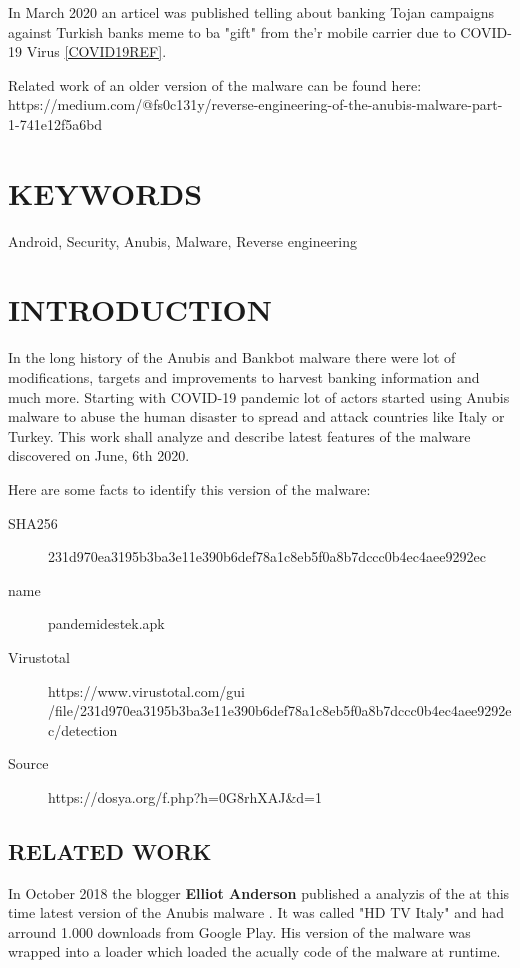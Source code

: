 \documentclass[10pt,titlepage]{article}
\begin{document}
In March 2020 an articel was published telling about banking Tojan campaigns against Turkish banks meme to ba "gift" from the'r mobile carrier due to COVID-19 Virus \ref{COVID19REF}. \cite{ANUBISTURKEY2020} 


Related work of an older version of the malware can be found here: https://medium.com/@fs0c131y/reverse-engineering-of-the-anubis-malware-part-1-741e12f5a6bd

\section{KEYWORDS}
	Android,
    Security,
    Anubis,
    Malware,
    Reverse engineering

\section{INTRODUCTION}
In the long history of the Anubis and Bankbot malware there were lot of modifications, targets and improvements to harvest banking information and much more. Starting with COVID-19 pandemic lot of actors started using Anubis malware to abuse the human disaster to spread and attack countries like Italy or Turkey. This work shall analyze and describe latest features of the malware discovered on June, 6th 2020.

Here are some facts to identify this version of the malware:
\begin{description}
\item[SHA256] 231d970ea3195b3ba3e11e390b6def78a1c8eb5f0a8b7dccc0b4ec4aee9292ec
\item[name] pandemidestek.apk
\item[Virustotal] https://www.virustotal.com/gui
\\  /file/231d970ea3195b3ba3e11e390b6def78a1c8eb5f0a8b7dccc0b4ec4aee9292ec/detection
\item[Source] https://dosya.org/f.php?h=0G8rhXAJ\&d=1
\end{description}

\subsection{RELATED WORK}
In October 2018 the blogger \textbf{Elliot Anderson} published a analyzis of the at this time latest version of the Anubis malware \cite{REVEANUBIS}. It was called "HD TV Italy" and had arround 1.000 downloads from Google Play.
His version of the malware was wrapped into a loader which loaded the acually code of the malware at runtime.
\end{document}
